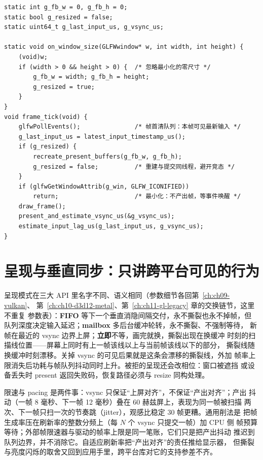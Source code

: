 \documentclass[12pt,a4paper,fontset=fandol]{ctexbook}
\begin{document}
\begin{lstlisting}[style=cstyle,label={lst:ch12-event-pump},caption={帧首清事件、按 framebuffer 尺寸重建呈现缓冲的骨架}]
static int g_fb_w = 0, g_fb_h = 0;
static bool g_resized = false;
static uint64_t g_last_input_us, g_vsync_us;

static void on_window_size(GLFWwindow* w, int width, int height) {
    (void)w;
    if (width > 0 && height > 0) {  /* 忽略最小化的零尺寸 */
        g_fb_w = width; g_fb_h = height;
        g_resized = true;
    }
}
void frame_tick(void) {
    glfwPollEvents();               /* 帧首清队列：本帧可见最新输入 */
    g_last_input_us = latest_input_timestamp_us();
    if (g_resized) {
        recreate_present_buffers(g_fb_w, g_fb_h);
        g_resized = false;          /* 重建与提交同线程，避开竞态 */
    }
    if (glfwGetWindowAttrib(g_win, GLFW_ICONIFIED))
        return;                     /* 最小化：不产出帧，等事件唤醒 */
    draw_frame();
    present_and_estimate_vsync_us(&g_vsync_us);
    estimate_input_lag_us(g_last_input_us, g_vsync_us);
}
\end{lstlisting}

\section{呈现与垂直同步：只讲跨平台可见的行为}
\label{sec:ch12-present-vsync}

呈现模式在三大 API 里名字不同、语义相同（参数细节各回第~\ref{ch:ch09-vulkan}、
第~\ref{ch:ch10-d3d12-metal}、第~\ref{ch:ch11-gl-legacy} 章的交换链节，这里不重复
参数表）：\textbf{FIFO} 等下一个垂直消隐间隔交付，永不撕裂也永不掉帧，但
队列深度决定输入延迟；\textbf{mailbox} 多后台缓冲轮转，永不撕裂、不强制等待，
新帧在最近的 vsync 边界上屏；\textbf{立即}不等，画完就换，撕裂出现在换缓冲
时刻的扫描线位置——屏幕上同时有上一帧该线以上与当前帧该线以下的部分，
撕裂线随换缓冲时刻漂移。关掉 vsync 的可见后果就是这条会漂移的撕裂线，外加
帧率上限消失后功耗与帧队列抖动同时上升。被拒的呈现还会改相位：窗口被遮挡
或设备丢失时 present 返回失败码，恢复路径必须与 resize 同构处理。

限速与 pacing 是两件事：vsync 只保证``上屏对齐''，不保证``产出对齐''；产出
抖动（一帧 8 毫秒、下一帧 12 毫秒）叠在 60 赫兹屏上，表现为同一帧被扫描
两次、下一帧只扫一次的节奏跳（jitter），观感比稳定 30 帧更糟。通用削法是
把帧生成率压在刷新率的整数分频上（每 $N$ 个 vsync 只提交一帧）加 CPU 侧
帧预算等待；外部帧限速器与驱动的帧率上限是同一笔账，它们只是把产出抖动
推迟到队列边界，并不消除它。自适应刷新率把``产出对齐''的责任推给显示器，
但撕裂与亮度闪烁的取舍又回到应用手里，跨平台库对它的支持参差不齐。
\end{document}
